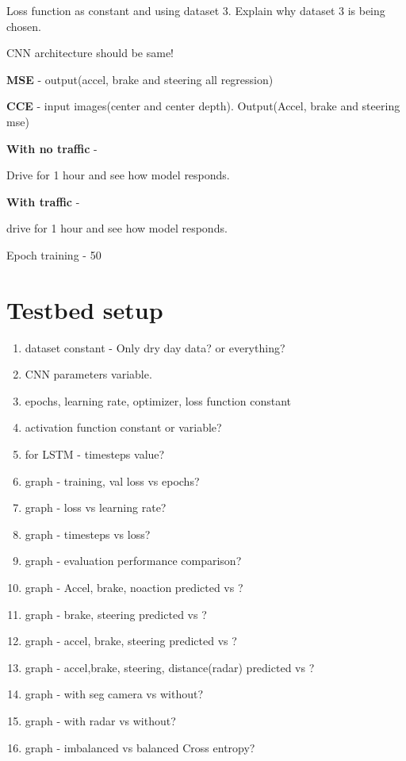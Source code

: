 Loss function as constant and using dataset 3. Explain why dataset 3 is being chosen.

CNN architecture should be same!

\textbf{MSE} - output(accel, brake and steering all regression)

\textbf{CCE} - input images(center and center depth). Output(Accel, brake and steering mse)

\textbf{With no traffic} -

Drive for 1 hour and see how model responds.

\textbf{With traffic} -

drive for 1 hour and see how model responds.

Epoch training - 50
\section{Testbed setup}

\begin{enumerate}
    \item dataset constant - Only dry day data?
        or everything?
    \item CNN parameters variable.
    \item epochs, learning rate, optimizer, loss function constant
    \item activation function constant or variable?
    \item for LSTM - timesteps value?
    \item graph - training, val loss vs epochs?
    \item graph - loss vs learning rate?
    \item graph - timesteps vs loss?
    \item graph - evaluation performance comparison?
    \item graph - Accel, brake, noaction predicted vs ?
    \item graph - brake, steering predicted vs ?
    \item graph - accel, brake, steering predicted vs ?
    \item graph - accel,brake, steering, distance(radar) predicted vs ?
    \item graph - with seg camera vs without?
    \item graph - with radar vs without?
    \item graph - imbalanced vs balanced Cross entropy?


\end{enumerate}
